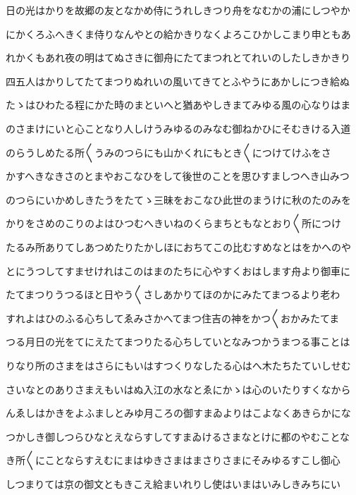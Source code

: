 \documentclass[a4paper,11pt,landscape]{ltjtarticle}
\begin{document}
\par\medskip
日の光はかりを故郷の友となかめ侍にうれしきつり舟をなむかの浦にしつやか
\par\medskip
にかくろふへきくま侍りなんやとの給かきりなくよろこひかしこまり申ともあ
\par\medskip
れかくもあれ夜の明はてぬさきに御舟にたてまつれとてれいのしたしきかきり
\par\medskip
四五人はかりしてたてまつりぬれいの風いてきてとふやうにあかしにつき給ぬ
\par\medskip
たゝはひわたる程にかた時のまといへと猶あやしきまてみゆる風の心なりはま
\par\medskip
のさまけにいと心ことなり人しけうみゆるのみなむ御ねかひにそむきける入道
\par\medskip
のらうしめたる所〱うみのつらにも山かくれにもとき〱につけてけふをさ
\par\medskip
かすへきなきさのとまやおこなひをして後世のことを思ひすましつへき山みつ
\par\medskip
のつらにいかめしきたうをたてゝ三昧をおこなひ此世のまうけに秋のたのみを
\par\medskip
かりをさめのこりのよはひつむへきいねのくらまちともなとおり〱所につけ
\par\medskip
たるみ所ありてしあつめたりたかしほにおちてこの比むすめなとはをかへのや
\par\medskip
とにうつしてすませけれはこのはまのたちに心やすくおはします舟より御車に
\par\medskip
たてまつりうつるほと日やう〱さしあかりてほのかにみたてまつるより老わ
\par\medskip
すれよはひのふる心ちしてゑみさかへてまつ住吉の神をかつ〱おかみたてま
\par\medskip
つる月日の光をてにえたてまつりたる心ちしていとなみつかうまつる事ことは
\par\medskip
りなり所のさまをはさらにもいはすつくりなしたる心はへ木たちたていしせむ
\par\medskip
さいなとのありさまえもいはぬ入江の水なとゑにかゝは心のいたりすくなから
\par\medskip
んゑしはかきをよふましとみゆ月ころの御すまゐよりはこよなくあきらかにな
\par\medskip
つかしき御しつらひなとえならすしてすまゐけるさまなとけに都のやむことな
\par\medskip
き所〱にことならすえむにまはゆきさまはまさりさまにそみゆるすこし御心
\par\medskip
しつまりては京の御文ともきこえ給まいれりし使はいまはいみしきみちにい
\par\medskip
\end{document}
